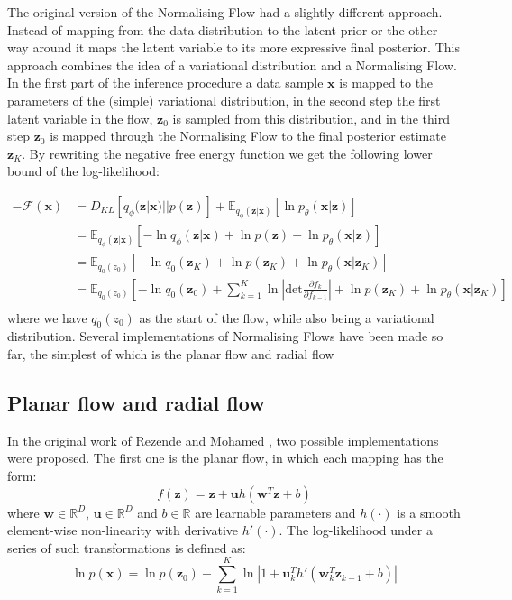 \documentclass{report}
\newcommand{\E}{\mathbb{E}}
\newcommand{\bu}{\mathbf{u}}
\newcommand{\bw}{\mathbf{w}}
\newcommand{\bx}{\mathbf{x}}
\newcommand{\bz}{\mathbf{z}}
\newcommand{\parfrac}[2]{\frac{\partial #1}{\partial#2}}
\begin{document}
The original version of the Normalising Flow had a slightly different approach. Instead of mapping from the data distribution to the latent prior or the other way around it maps the latent variable to its more expressive final posterior. This approach combines the idea of a variational distribution and a Normalising Flow. In the first part of the inference procedure a data sample $\bx$ is mapped to the parameters of the (simple) variational distribution, in the second step the first latent variable in the flow, $\bz_0$ is sampled from this distribution, and in the third step $\bz_0$ is mapped through the Normalising Flow to the final posterior estimate $\bz_K$. By rewriting the negative free energy function we get the following lower bound of the log-likelihood:

\begin{equation}\label{equation:negative_free_energy_with_flow}
    \begin{split}
    -\mathcal{F}(\bx) &= D_{KL}[q_\phi(\bz|\bx) || p(\bz)] + \E_{q_\phi(\bz|\bx)}[\ln p_\theta(\bx|\bz)]\\
    &= \E_{q_\phi(\bz|\bx)}[-\ln q_\phi(\bz|\bx) + \ln p(\bz) + \ln p_\theta(\bx|\bz)]\\
    &= \E_{q_0(z_0)}[-\ln q_0(\bz_K) + \ln p(\bz_K) + \ln p_\theta(\bx|\bz_K)]\\
    &= \E_{q_0(z_0)}[-\ln q_0(\bz_0) + \sum\limits^K_{k=1}\ln \left|\text{det} \parfrac{f_k}{f_{k-1}} \right| + \ln p(\bz_K) + \ln p_\theta(\bx|\bz_K)]\\
    \end{split}
\end{equation}
where we have $q_0(z_0)$ as the start of the flow, while also being a variational distribution. Several implementations of Normalising Flows have been made so far, the simplest of which is the planar flow and radial flow

\subsection{Planar flow and radial flow}\label{section:planar_radial_flow}
In the original work of Rezende and Mohamed \cite{rezende2016variational}, two possible implementations were proposed. The first one is the planar flow, in which each mapping has the form:
\begin{equation}\label{equation:planar_flow}
    f(\bz) = \bz + \bu h(\bw^T\bz + b)
\end{equation}
where $\bw \in \mathbb{R}^D$, $\bu \in \mathbb{R}^D$ and $b \in \mathbb{R}$ are learnable parameters and $h(\cdot)$ is a smooth element-wise non-linearity with derivative $h'(\cdot)$. The log-likelihood under a series of such transformations is defined as:
\begin{equation}\label{equation:planar_flow_logdet}
    \ln p(\bx) = \ln p(\bz_0) - \sum\limits^K_{k=1} \ln \left|1 + \bu_k^T h'(\bw_k^T \bz_{k-1} + b) \right|
\end{equation}
\end{document}
